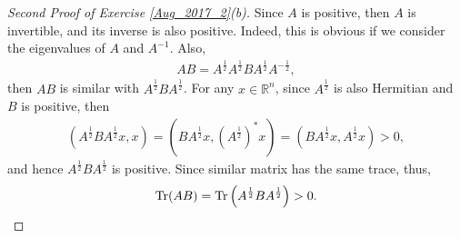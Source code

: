 \documentclass[11pt]{article}
\theoremstyle{definition}
\numberwithin{equation}{subsection}
\begin{document}
\begin{proof}[Second Proof of Exercise \ref{Aug_2017_2}(b)]
Since $A$ is positive, then $A$ is invertible, and its inverse is also positive. Indeed, this is obvious if we consider the eigenvalues of $A$ and $A^{-1}$. Also, 
\begin{align*}
    AB = A^{\frac{1}{2}} A^{\frac{1}{2}} B A^{\frac{1}{2}} A^{-\frac{1}{2}},
\end{align*}
then $AB$ is similar with $A^{\frac{1}{2}} B A^{\frac{1}{2}}$. For any $x \in \mathbb{R}^n$, since $A^{\frac{1}{2}}$ is also Hermitian and $B$ is positive, then
\begin{align*}
    \left(A^{\frac{1}{2}} B A^{\frac{1}{2}}x, x\right) = \left(  B A^{\frac{1}{2}}x, \left(A^{\frac{1}{2}}\right)^* x\right) = \left(  B A^{\frac{1}{2}}x, A^{\frac{1}{2}} x\right) > 0,
\end{align*}
and hence $A^{\frac{1}{2}} B A^{\frac{1}{2}}$ is positive. Since similar matrix has the same trace, thus,
\begin{align*}
    \Tr(AB) = \Tr \left(A^{\frac{1}{2}} B A^{\frac{1}{2}} \right) > 0.
\end{align*}
\end{proof}

\medskip
\end{document}
